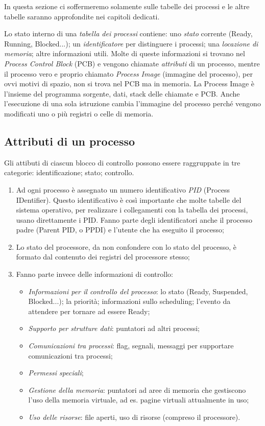In questa sezione ci soffermeremo solamente sulle tabelle dei processi e le altre tabelle saranno approfondite nei capitoli dedicati.

Lo stato interno di una \textit{tabella dei processi} contiene: uno \textit{stato} corrente (Ready, Running, Blocked...); un \textit{identificatore} per distinguere i processi; una \textit{locazione di memoria}; altre informazioni utili. Molte di queste informazioni si trovano nel \textit{Process Control Block} (PCB) e vengono chiamate \textit{attributi} di un processo, mentre il processo vero e proprio chiamato \textit{Process Image} (immagine del processo), per ovvi motivi di spazio, non si trova nel PCB ma in memoria. La Process Image è l'insieme del programma sorgente, dati, stack delle chiamate e PCB. Anche l'esecuzione di una sola istruzione cambia l'immagine del processo perché vengono modificati uno o più registri o celle di memoria.

\subsection*{Attributi di un processo}
Gli attibuti di ciascun blocco di controllo possono essere raggruppate in tre categorie: identificazione; stato; controllo.
\begin{enumerate}
    \item Ad ogni processo è assegnato un numero identificativo \textit{PID} (Process IDentifier). Questo identificativo è così importante che  molte tabelle del sistema operativo, per realizzare i collegamenti con la tabella dei processi, usano direttamente i PID. Fanno parte degli identificatori anche il processo padre (Parent PID, o PPDI) e l'utente che ha eseguito il processo;
    \item Lo stato del processore, da non confondere con lo stato del processo, è formato dal contenuto dei registri del processore stesso;
    \item Fanno parte invece delle informazioni di controllo: 
    \begin{itemize}
        \item \textit{Informazioni per il controllo del processo}: lo stato (Ready, Suspended, Blocked...); la priorità; informazioni sullo scheduling; l'evento da attendere per tornare ad essere Ready;
        \item \textit{Supporto per strutture dati}: puntatori ad altri processi;
        \item \textit{Comunicazioni tra processi}: flag, segnali, messaggi per supportare comunicazioni tra processi;
        \item \textit{Permessi speciali};
        \item \textit{Gestione della memoria}: puntatori ad aree di memoria che gestiscono l'uso della memoria virtuale, ad es. pagine virtuali attualmente in uso;
        \item \textit{Uso delle risorse}: file aperti, uso di risorse (compreso il processore).
    \end{itemize}
\end{enumerate}

